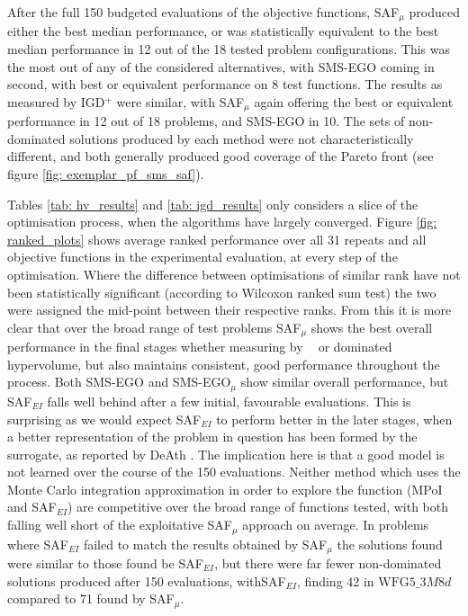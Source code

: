 \documentclass[conference]{IEEEtran}
\newcommand{\ndim}{d}
\newcommand{\nobj}{M}
\DeclareMathOperator*{\igdp}{IGD^{+}}
\newcommand\hpv{dominated hypervolume\xspace}
\newcommand\safmu{SAF$_{\mu}$\xspace}
\newcommand\safei{SAF$_{EI}$\xspace}
\newcommand\smsego{SMS-EGO\xspace}
\newcommand\smsegomu{SMS-EGO$_{\mu}$\xspace}
\newcommand\mpoi{MPoI\xspace}
\newcommand\igd{IGD$^+$\xspace}
\begin{document}
After the full 150 budgeted evaluations of the objective functions, \safmu produced either the best median performance, or was statistically equivalent to the best median performance in 12 out of the 18 tested problem configurations. This was the most out of any of the considered alternatives, with \smsego coming in second, with best or equivalent performance on 8 test functions. The results as measured by \igd were similar, with \safmu again offering the best or equivalent performance in 12 out of 18 problems, and \smsego in 10. The sets of non-dominated solutions produced by each method were not characteristically different, and both generally produced good coverage of the Pareto front (see figure \ref{fig: exemplar_pf_sms_saf}).  

Tables \ref{tab: hv_results} and \ref{tab: igd_results} only considers a slice of the optimisation process, when the algorithms have largely converged. Figure \ref{fig: ranked_plots} shows average ranked performance over all 31 repeats and all objective functions in the experimental evaluation, at every step of the optimisation. Where the difference between optimisations of similar rank have not been statistically significant (according to Wilcoxon ranked sum test) the two were assigned the mid-point between their respective ranks. From this it is more clear that over the broad range of test problems \safmu shows the  best overall performance in the final stages whether measuring by $\igdp$ or \hpv, but also maintains consistent, good performance throughout the process. Both \smsego and \smsegomu show similar overall performance, but \safei falls well behind after a few initial, favourable evaluations. This is surprising as we would expect \safei to perform better in the later stages, when a better representation of the problem in question has been formed by the surrogate, as reported by DeAth \cite{death2019greed}. The implication here is that a good model is not learned over the course of the 150 evaluations. Neither method which uses the Monte Carlo integration approximation in order to explore the function (\mpoi and \safei) are competitive over the broad range of functions tested, with both falling well short of the exploitative \safmu approach on average. In problems where \safei failed to match the results obtained by \safmu the solutions found were similar to those found be \safei, but there were far fewer non-dominated solutions produced after 150 evaluations, with\safei, finding 42 in $\text{WFG}5\_3\nobj8\ndim$ compared to 71 found by \safmu.
\end{document}
